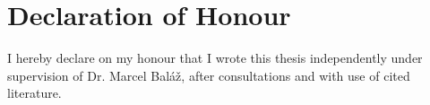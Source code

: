 \thispagestyle{empty}
\vspace*{\fill}
\section*{Declaration of Honour}

I hereby declare on my honour that I wrote this thesis independently under supervision of Dr. Marcel Baláž, after consultations and with use of cited literature.

\vspace{3\medskipamount}\noindent
\SignPlace \SignDateEN \hspace*{\fill} \signaturespace{5cm}{\Author} 
